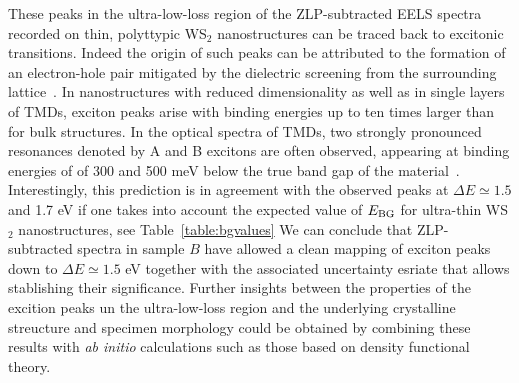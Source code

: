 These peaks in the ultra-low-loss region of the ZLP-subtracted EELS spectra recorded on thin, polyttypic
WS$_2$ nanostructures can be traced back to excitonic transitions.
%
Indeed the origin of such peaks can be attributed to the formation of an electron-hole pair mitigated
by the dielectric screening from the surrounding lattice~\cite{Hanbicki:2016}.
%
In nanostructures with reduced dimensionality as well as in single layers of TMDs,
exciton peaks arise with binding energies up to ten times larger than for bulk structures.
%
In the optical spectra of TMDs, two strongly pronounced resonances denoted by A and B
excitons are often observed, appearing at binding energies of of 300 and
500 meV below the true band gap of the material~\cite{Karivaj:2019}.
%
Interestingly, this prediction is in agreement with the observed peaks at
$\Delta E\simeq 1.5$ and 1.7 eV if one takes into account the expected
value of $E_{\rm BG}$ for ultra-thin  WS$_2$ nanostructures, see Table~\ref{table:bgvalues}
%
We can conclude that ZLP-subtracted spectra in sample $B$ have allowed
a clean mapping of exciton peaks down to $\Delta E\simeq 1.5$ eV together with
the associated uncertainty esriate that allows stablishing their significance.
%
Further insights between the properties of the excition peaks un the ultra-low-loss region
and the underlying crystalline streucture and specimen morphology could be obtained
by combining these results with {\it ab initio} calculations such as those based
on density functional theory.
